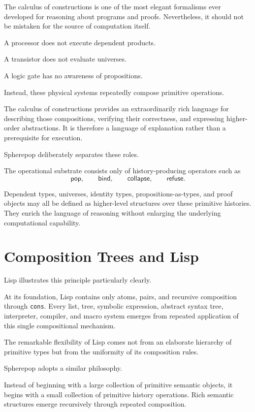 \documentclass[12pt,oneside]{article}
\newcommand{\Pop}{\mathsf{pop}}
\newcommand{\Refuse}{\mathsf{refuse}}
\newcommand{\Collapse}{\mathsf{collapse}}
\newcommand{\Bind}{\mathsf{bind}}
\begin{document}
The calculus of constructions is one of the most elegant formalisms ever developed for reasoning about programs and proofs. Nevertheless, it should not be mistaken for the source of computation itself.

A processor does not execute dependent products.

A transistor does not evaluate universes.

A logic gate has no awareness of propositions.

Instead, these physical systems repeatedly compose primitive operations.

The calculus of constructions provides an extraordinarily rich language for describing those compositions, verifying their correctness, and expressing higher-order abstractions. It is therefore a language of explanation rather than a prerequisite for execution.

Spherepop deliberately separates these roles.

The operational substrate consists only of history-producing operators such as
\[
\Pop,\qquad
\Bind,\qquad
\Collapse,\qquad
\Refuse.
\]

Dependent types, universes, identity types, propositions-as-types, and proof objects may all be defined as higher-level structures over these primitive histories. They enrich the language of reasoning without enlarging the underlying computational capability.

\section{Composition Trees and Lisp}

Lisp illustrates this principle particularly clearly.

At its foundation, Lisp contains only atoms, pairs, and recursive composition through \texttt{cons}. Every list, tree, symbolic expression, abstract syntax tree, interpreter, compiler, and macro system emerges from repeated application of this single compositional mechanism.

The remarkable flexibility of Lisp comes not from an elaborate hierarchy of primitive types but from the uniformity of its composition rules.

Spherepop adopts a similar philosophy.

Instead of beginning with a large collection of primitive semantic objects, it begins with a small collection of primitive history operations. Rich semantic structures emerge recursively through repeated composition.
\end{document}
